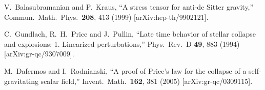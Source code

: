 \documentclass[12pt,onecolumn,eqsecnum,aps,prd,nofootinbib]{revtex4}
\begin{document}
\begin{thebibliography}{99}
 V.~Balasubramanian and P.~Kraus,
  ``A stress tensor for anti-de Sitter gravity,''
  Commun.\ Math.\ Phys.\  {\bf 208}, 413 (1999)
  [arXiv:hep-th/9902121].

   C.~Gundlach, R.~H.~Price and J.~Pullin,
  ``Late time behavior of stellar collapse and explosions: 1. Linearized
  perturbations,''
  Phys.\ Rev.\  D {\bf 49}, 883 (1994)
  [arXiv:gr-qc/9307009].

M.~Dafermos and I.~Rodnianski,
  ``A proof of Price's law for the collapse of a self-gravitating scalar
  field,''
  Invent.\ Math.\  {\bf 162}, 381 (2005)
  [arXiv:gr-qc/0309115].


\end{thebibliography}
\end{document}
